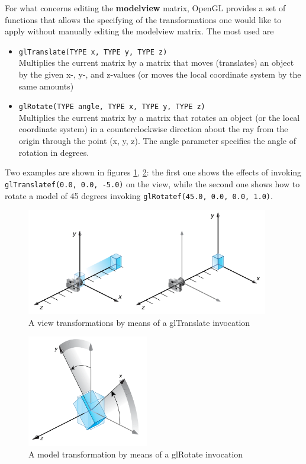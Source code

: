 For what concerns editing the \textbf{modelview} matrix, OpenGL 
provides a set of functions that allows the specifying of the 
transformations one would like to apply without manually 
editing the modelview matrix. The most used are 

\begin{itemize}
\item \texttt{glTranslate(TYPE x, TYPE y, TYPE z)}\\
  Multiplies the current matrix by a matrix that moves 
  (translates) an object by the given x-, y-, and z-values 
  (or moves the local coordinate system by the same amounts)

\item \texttt{glRotate(TYPE angle, TYPE x, TYPE y, TYPE z)} \\
  Multiplies the current matrix by a matrix that rotates an 
  object (or the   local coordinate system) in a counterclockwise 
  direction about the ray from the origin through the point 
  (x, y, z). The angle parameter specifies the angle of rotation in degrees.
\end{itemize}

Two examples are shown in figures \ref{fig:gltranslate}, \ref{fig:glrotate}:
the first one shows the effects of invoking \texttt{glTranslatef(0.0, 0.0, -5.0)} 
on the view, while the second one shows how to rotate a model of 45 degrees 
invoking \texttt{glRotatef(45.0, 0.0, 0.0, 1.0)}.

\begin{figure}[!h]
  \begin{center}
    \includegraphics[width=300pt]{img/gltranslate.png}
    \caption{A view transformations by means of a glTranslate invocation}
    \label{fig:gltranslate}
  \end{center}
\end{figure}

\begin{figure}[!h]
  \begin{center}
    \includegraphics[width=150pt]{img/glrotate.png}
    \caption{A model transformation by means of a glRotate invocation}
    \label{fig:glrotate}
  \end{center}
\end{figure}
